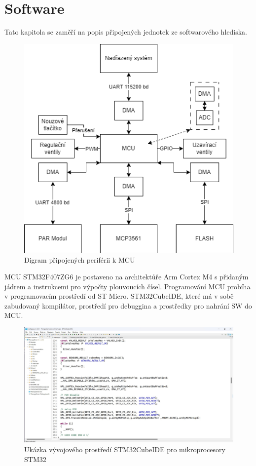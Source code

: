 \chapter{Software}
Tato kapitola se zaměří na popis připojených jednotek ze softwarového hlediska.
\begin{figure}[H]
    \label{fig:sw_diagram}
    \caption{Digram připojených periférii k MCU}
    \includegraphics[width=1\textwidth]{pictures/sw_diagram.png}
\end{figure}
MCU STM32F407ZG6 je postaveno na architektůře Arm Cortex M4 s přidaným jádrem a instrukcemi pro výpočty plouvoucích čísel.
Programování MCU probíha v programovacím prostředí od ST Micro. STM32CubeIDE, které má v sobě zabudovaný kompilátor, prostředí pro debuggina a prostředky pro nahrání SW do MCU.
\begin{figure}[H]
    \caption{Ukázka vývojového prostředí STM32CubeIDE pro mikroprocesory STM32}
    \includegraphics[width=1\textwidth]{pictures/cubeide.jpg}
\end{figure}
